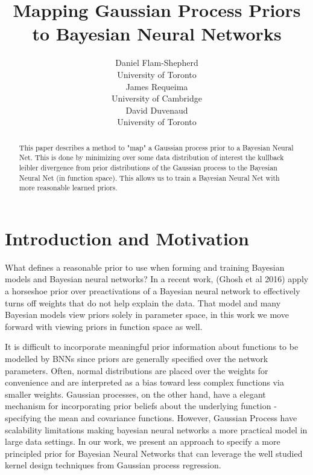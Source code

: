 \documentclass{article}
\title{Mapping Gaussian Process Priors
\\ to Bayesian Neural Networks}
\author{
  Daniel Flam-Shepherd \\
  University of Toronto \\
  \And
  James Requeima  \\
  University of Cambridge \\
  \AND
  David Duvenaud \\
  University of Toronto \\
}
\begin{document}

\maketitle


\begin{abstract}
This paper describes a method to "map" a Gaussian process prior to a Bayesian Neural Net.
This is done by minimizing over some data distribution of interest the kullback leibler
divergence from prior distributions of the Gaussian process to the Bayesian Neural Net
(in function space). This allows us to train a Bayesian Neural Net with more reasonable 
learned priors. 
\end{abstract}

\section{Introduction and Motivation}

What defines a reasonable prior to use when forming and training Bayesian models 
and Bayesian neural networks? In a recent work, (Ghosh et al 2016) 
apply a horseshoe prior over preactivations of a Bayesian neural network to 
effectively turns off weights that do not help explain the data. That model and 
many Bayesian models view priors solely in parameter space, in this work we move 
forward with viewing priors in function space as well. 

It is difficult to incorporate meaningful prior information about functions to be modelled by BNNs since priors are generally specified over the network parameters. Often, normal distributions are placed over the weights for convenience and are interpreted as a bias toward less complex functions via smaller weights. Gaussian processes, on the other hand, have a elegant mechanism for incorporating prior beliefs about the underlying function - specifying the mean and covariance functions. However, Gaussian Process have scalability limitations making bayesian neural networks a more practical model in large data settings. In our work, we present an approach to specify a more principled prior for Bayesian Neural Networks that can leverage the well studied kernel design techniques from Gaussian process regression.
\end{document}
